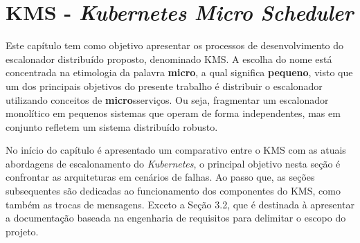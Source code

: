 \documentclass[
	12pt,				%
	openright,			%
	oneside,			%
	a4paper,			%
	brazil				%
	]{abntex2}
\providecommand{\DIFaddbegin}{} %
\providecommand{\DIFdelbegin}{} %
\providecommand{\DIFdelend}{} %
\newcommand{\DIFscaledelfig}{0.5}
\newlength{\DIFdelgraphicswidth} %
\newlength{\DIFdelgraphicsheight} %
\newcommand{\DIFaddincludegraphics}[2][]{{\color{blue}\fbox{\DIFOincludegraphics[#1]{#2}}}} %
\newcommand{\DIFdelincludegraphics}[2][]{%
\sbox{\DIFdelgraphicsbox}{\DIFOincludegraphics[#1]{#2}}%
\settoboxwidth{\DIFdelgraphicswidth}{\DIFdelgraphicsbox} %
\settoboxtotalheight{\DIFdelgraphicsheight}{\DIFdelgraphicsbox} %
\scalebox{\DIFscaledelfig}{%
\parbox[b]{\DIFdelgraphicswidth}{\usebox{\DIFdelgraphicsbox}\\[-\baselineskip] \rule{\DIFdelgraphicswidth}{0em}}\llap{\resizebox{\DIFdelgraphicswidth}{\DIFdelgraphicsheight}{%
\setlength{\unitlength}{\DIFdelgraphicswidth}%
\begin{picture}(1,1)%
\thicklines\linethickness{2pt} %
{\color[rgb]{1,0,0}\put(0,0){\framebox(1,1){}}}%
{\color[rgb]{1,0,0}\put(0,0){\line( 1,1){1}}}%
{\color[rgb]{1,0,0}\put(0,1){\line(1,-1){1}}}%
\end{picture}%
}\hspace*{3pt}}} %
} %
\DeclareRobustCommand{\DIFaddbegin}{\DIFOaddbegin \let\includegraphics\DIFaddincludegraphics} %
\DeclareRobustCommand{\DIFdelbegin}{\DIFOdelbegin \let\includegraphics\DIFdelincludegraphics} %
\DeclareRobustCommand{\DIFdelend}{\DIFOaddend \let\includegraphics\DIFOincludegraphics} %
\begin{document}
% 

\chapter{KMS - \textit{Kubernetes Micro Scheduler}}

Este capítulo tem como objetivo apresentar os processos de desenvolvimento do escalonador distribuído proposto, denominado \ac{KMS}. A escolha do nome está concentrada na etimologia da palavra \textbf{micro}, a qual significa \textbf{pequeno}, visto que um dos principais objetivos do presente trabalho é distribuir o escalonador utilizando conceitos de \textbf{micro}sserviços. Ou seja, fragmentar um escalonador monolítico em pequenos sistemas que operam de forma independentes, mas em conjunto refletem um sistema distribuído robusto.

No início do capítulo é apresentado um comparativo entre o \ac{KMS} com as atuais abordagens de escalonamento do \textit{Kubernetes}, o principal objetivo nesta seção é confrontar as arquiteturas em cenários de falhas. Ao passo que, as seções subsequentes são dedicadas ao funcionamento dos componentes do \ac{KMS}, como também as trocas de mensagens. Exceto a Seção 3.2, que é destinada à apresentar a documentação baseada na engenharia de requisitos para delimitar o escopo do projeto.


\DIFdelbegin %
\DIFdelend \DIFaddbegin 
\end{document}
